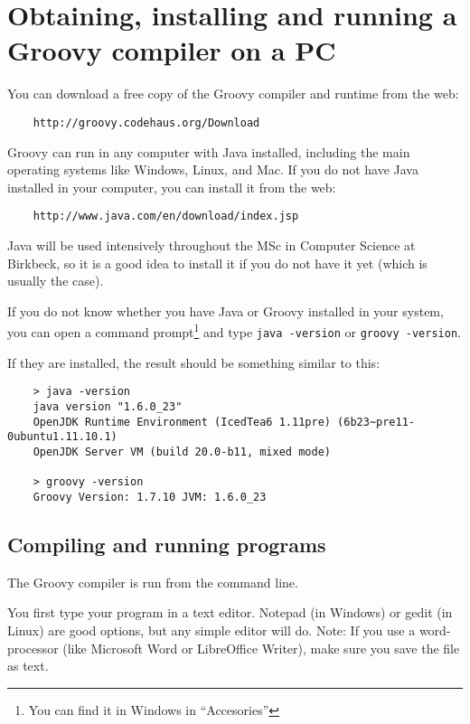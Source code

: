 \section{Obtaining, installing and running a Groovy compiler on a PC}

You can download a free copy of the Groovy compiler and runtime from the web:

\begin{verbatim}
    http://groovy.codehaus.org/Download
\end{verbatim}

Groovy can run in any computer with Java installed, including the main
operating systems like Windows, Linux, and Mac. If you do not have
Java installed in your computer, you can install it from the web:

\begin{verbatim}
    http://www.java.com/en/download/index.jsp
\end{verbatim}

Java will be used intensively throughout the MSc in Computer Science
at Birkbeck, so it is a good idea to install it if you do not have it
yet (which is usually the case).

If you do not know whether you have Java or Groovy installed in your
system, you can open a command prompt\footnote{You can find it in Windows in
  ``Accesories''} and type \verb+java -version+ or \verb+groovy -version+. 

If they are installed, the result should be something similar to this:

\begin{verbatim}
    > java -version
    java version "1.6.0_23"
    OpenJDK Runtime Environment (IcedTea6 1.11pre) (6b23~pre11-0ubuntu1.11.10.1)
    OpenJDK Server VM (build 20.0-b11, mixed mode)

    > groovy -version
    Groovy Version: 1.7.10 JVM: 1.6.0_23
\end{verbatim}



\subsection{Compiling and running programs}

The Groovy compiler is run from the command line.

You first type your program in a text editor. Notepad (in Windows) or
gedit (in Linux) are good options, but any simple editor will
do. Note: If you use a word-processor (like Microsoft Word or
LibreOffice Writer), make sure you save the file as text.

